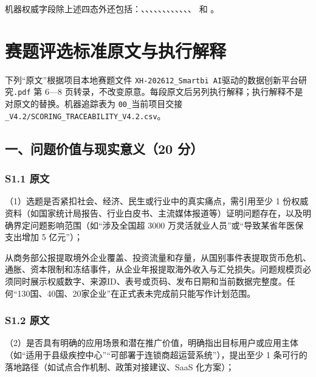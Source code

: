 机器权威字段除上述四态外还包括：、、、、、、、、、、、、 和 。

\chapter{赛题评选标准原文与执行解释}

\begin{warningbox}[原文保留说明]
下列“原文”根据项目本地赛题文件 \texttt{XH-202612\_Smartbi AI}驱动的数据创新平台研究\texttt{.pdf} 第 6—8 页转录，不改变原意。每段原文后另列执行解释；执行解释不是对原文的替换。机器追踪表为 \texttt{00\_}当前项目交接\texttt{\_V4.2/SCORING\_TRACEABILITY\_V4.2.csv}。
\end{warningbox}

\section{一、问题价值与现实意义（20 分）}

\subsection*{S1.1 原文}
（1）选题是否紧扣社会、经济、民生或行业中的真实痛点，需引用至少 1 份权威资料（如国家统计局报告、行业白皮书、主流媒体报道等）证明问题存在，以及明确界定问题影响范围（如“涉及全国超 3000 万灵活就业人员”或“导致某省年医保支出增加 5 亿元”）；

\begin{decisionbox}[S1.1 怎么做]
从商务部公报提取境外企业覆盖、投资流量和存量，从国别事件表提取货币危机、通胀、资本限制和冻结事件，从企业年报提取海外收入与汇兑损失。问题规模页必须同时展示权威数字、来源ID、表号或页码、发布日期和当前数据完整度。任何“130国、40国、20家企业”在正式表未完成前只能写作计划范围。
\end{decisionbox}

\subsection*{S1.2 原文}
（2）是否具有明确的应用场景和潜在推广价值，明确指出目标用户或应用主体（如“适用于县级疾控中心”“可部署于连锁商超运营系统”），提出至少 1 条可行的落地路径（如试点合作机制、政策对接建议、SaaS 化方案）；

